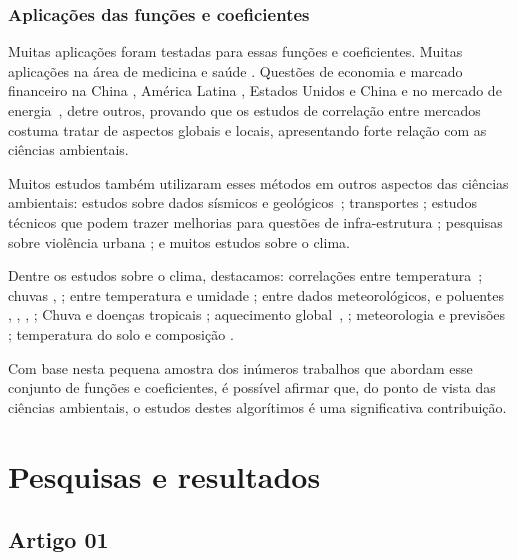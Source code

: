 \documentclass[11pt, aspectratio=169]{beamer}
\begin{document}
\begin{frame}[allowframebreaks]
  \frametitle{Aplicações das funções e coeficientes}
Muitas aplicações foram testadas para essas funções e coeficientes. Muitas aplicações na área de medicina e saúde \cite{CHEN2018171, FILHO2023128802, GE2023114155, GHOSH2018392}. Questões de economia e marcado financeiro na China \cite{LI2024123716}, América Latina \cite{CONTRERASREYES2024130115}, Estados Unidos e China \cite{CHEN2024e36537} e no mercado de energia~\cite{ASLAM2024102085}, detre outros, provando que os estudos de correlação entre mercados costuma tratar de aspectos globais e locais, apresentando forte relação com as ciências ambientais.

Muitos estudos também utilizaram esses métodos em outros aspectos das ciências ambientais: estudos sobre dados sísmicos \cite{shadkhooMultifractalDetrendedCrosscorrelation2009} e geológicos~\cite{BIANCHI2018377, QIN2024108559}; transportes \cite{SHI2018165, ZEBENDE20111677, ZEBENDE20094863}; estudos técnicos que podem trazer melhorias para questões de infra-estrutura \cite{RODRIGUESSANTOS2018294}; pesquisas sobre violência urbana \cite{MACHADOFILHO201412}; e muitos estudos sobre o clima.

Dentre os estudos sobre o clima, destacamos: correlações entre temperatura~\cite{YU2019122034}; chuvas \cite{ADARSH2020124913}, \cite{LI2024131535}; entre temperatura e umidade \cite{ZEBENDE201817}; entre dados meteorológicos, e poluentes \cite{SHI2014130}, \cite{HE201747}, \cite{ZHANG2015114}, \cite{SHEN2015417}; Chuva e doenças tropicais \cite{OLIVEIRA2023160491}; aquecimento global~\cite{CHATTERJEE2021125815}, \cite{YUAN201471}; meteorologia e previsões \cite{AFUECHETA2021100295, SHIN2019778}; temperatura do solo e composição \cite{KAR2019236}.

Com base nesta pequena amostra dos inúmeros trabalhos que abordam esse conjunto de funções e coeficientes, é possível afirmar que, do ponto de vista das ciências ambientais, o estudos destes algorítimos é uma significativa contribuição.

  
\end{frame}






\section{Pesquisas e resultados}

\subsection{Artigo 01}
\end{document}

